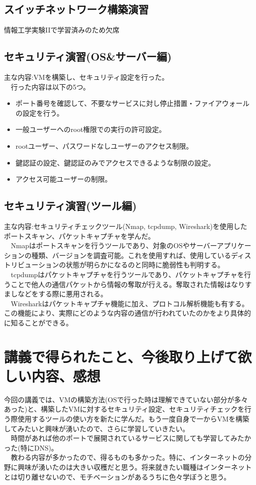 \documentclass[11pt,a4paper]{jsarticle}
\begin{document}
\subsection*{スイッチネットワーク構築演習}
情報工学実験IIで学習済みのため欠席


\subsection*{セキュリティ演習(OS\&サーバー編)}
主な内容:VMを構築し、セキュリティ設定を行った。\\
　行った内容は以下の5つ。
\begin{itemize}
\item ポート番号を確認して、不要なサービスに対し停止措置・ファイアウォールの設定を行う。
\item 一般ユーザーへのroot権限での実行の許可設定。
\item rootユーザー、パスワードなしユーザーのアクセス制限。
\item 鍵認証の設定、鍵認証のみでアクセスできるような制限の設定。
\item アクセス可能ユーザーの制限。
\end{itemize}


\newpage
\subsection*{セキュリティ演習(ツール編)}
主な内容:セキュリティチェックツール(Nmap, tcpdump, Wireshark)を使用したポートスキャン、パケットキャプチャを学んだ。\\
　Nmapはポートスキャンを行うツールであり、対象のOSやサーバーアプリケーションの種類、バージョンを調査可能。これを使用すれば、使用しているディストリビューションの状態が明らかになるのと同時に脆弱性も判明する。\\
　tcpdumpはパケットキャプチャを行うツールであり、パケットキャプチャを行うことで他人の通信パケットから情報の奪取が行える。奪取された情報はなりすましなどをする際に悪用される。\\
　Wiresharkはパケットキャプチャ機能に加え、プロトコル解析機能も有する。この機能により、実際にどのような内容の通信が行われていたのかをより具体的に知ることができる。


\section*{講義で得られたこと、今後取り上げて欲しい内容、感想}
今回の講義では、VMの構築方法(OSで行った時は理解できていない部分が多々あった)と、構築したVMに対するセキュリティ設定、セキュリティチェックを行う際使用するツールの使い方を新たに学んだ。もう一度自身で一からVMを構築してみたいと興味が湧いたので、さらに学習していきたい。\\
　時間があれば他のポートで展開されているサービスに関しても学習してみたかった(特にDNS)。\\
　教わる内容が多かったので、得るものも多かった。特に、インターネットの分野に興味が湧いたのは大きい収穫だと思う。将来就きたい職種はインターネットとは切り離せないので、モチベーションがあるうちに色々学ぼうと思う。
\end{document}
